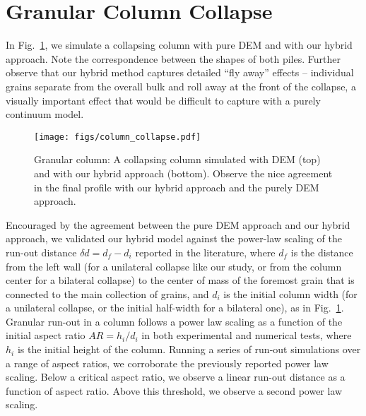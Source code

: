 %

%

%

%

%

%

\section{Granular Column Collapse}
In Fig.~\ref{fig:hybrid:column_collapse}, we simulate a collapsing column
with pure DEM and with our hybrid approach. Note the correspondence between the shapes of both
piles. Further observe that our hybrid method captures detailed ``fly away'' effects -- individual grains
separate from the overall bulk and roll away at the front of the collapse, a visually important effect that
would be difficult to capture with a purely continuum model.

\begin{figure}
  \centering
  \texttt{[image: figs/column\_collapse.pdf]}
  \caption{
    Granular column: A collapsing column simulated with DEM (top) and with our hybrid approach
    (bottom). Observe the nice agreement in the final profile with our hybrid approach and the purely DEM approach.
  }
  \label{fig:hybrid:column_collapse}
\end{figure}

Encouraged by the agreement between the pure DEM approach and our hybrid approach, we validated our hybrid
model against the power-law scaling of the run-out distance $\delta d = d_f - d_i$ reported in the literature,  
where $d_f$ is the distance from the left wall (for a unilateral collapse like our study, or from the column center for a bilateral collapse) to the center of mass of the foremost grain that is connected to the main collection of grains, and $d_i$ is the initial column width (for a unilateral collapse, or the initial half-width for a bilateral one), as in Fig.~\ref{fig:hybrid:column_collapse}.
Granular run-out in a column follows a power law scaling as a function of the initial aspect ratio $AR = h_i / d_i$ in both experimental \cite{Lube:2005,Balmforth:2005}
and numerical \cite{Staron:2005,Lagree:2011,Mast:2015,Dunatunga:2015:Continuum} tests, where $h_i$ is the initial height of the column. Running a series of run-out
simulations over a range of aspect ratios, we corroborate the previously reported power law scaling.
Below a critical aspect ratio, we observe a linear run-out distance as a function of aspect ratio. Above this
threshold, we observe a second power law scaling.

